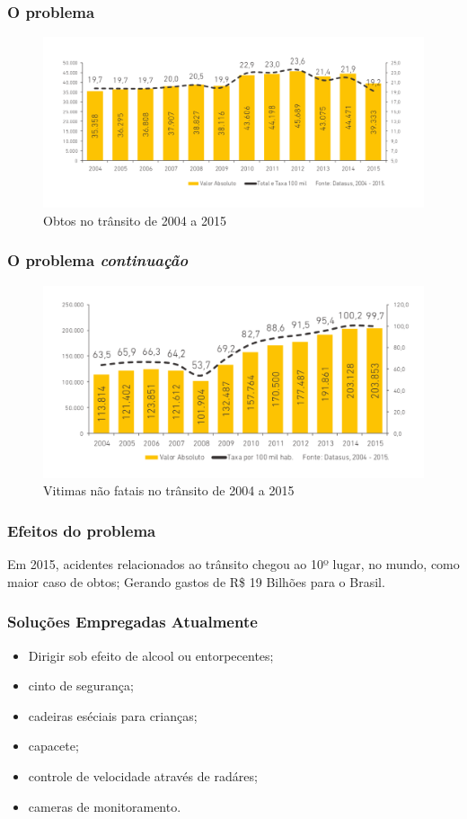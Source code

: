 \begin{frame}
	\frametitle{O problema}
\begin{figure}[h]
	\caption{Obtos no trânsito de 2004 a 2015}
	\centering
	\includegraphics[width=1\textwidth]{imagens/obto}
	\end{figure}
\end{frame}

\begin{frame}
	\frametitle{O problema \textit{continuação}}
\begin{figure}[h]
	\caption{Vitimas não fatais no trânsito de 2004 a 2015}
	\centering
	\includegraphics[width=1\textwidth]{imagens/ferido}
	\end{figure}
\end{frame}

\begin{frame}
	\frametitle{Efeitos do problema}
	Em 2015, acidentes relacionados ao trânsito chegou ao 
	10º lugar, no mundo, como maior caso de obtos;
	Gerando gastos de R\$ 19 Bilhões para o Brasil\cite{ambev}.
\end{frame}

\begin{frame}
	\frametitle{Soluções Empregadas Atualmente}
	\begin{itemize}[<+->]
		\item Dirigir sob efeito de alcool ou entorpecentes;
		\item cinto de segurança;
		\item cadeiras eséciais para crianças;
		\item capacete;
		\item controle de velocidade através de radáres;
		\item cameras de monitoramento.
 	\end{itemize}
\end{frame}